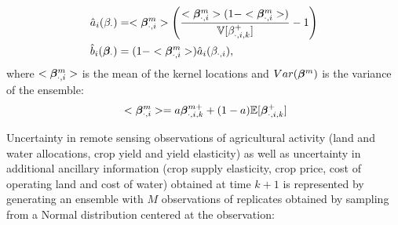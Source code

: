 \begin{equation}\label{eq:beta_params}
    \begin{split}
    &\hat{a}_i(\beta_{\cdot}) = <\bm{\beta}_{\cdot,i}^m>\left(\frac{<\bm{\beta}_{\cdot,i}^m>(1-<\bm{\beta}_{\cdot,i}^m>)}{\mathbb{V}[\beta_{\cdot,i,k}^+]} -1 \right)\\
    &\hat{b}_i(\bm{\beta}_{\cdot}) = (1-<\bm{\beta}_{\cdot,i}^m>)\hat{a}_i(\beta_{\cdot,i}),
    \end{split}
\end{equation}
 \noindent where $<\bm{\beta}_{\cdot,i}^m>$ is the mean of the kernel locations and $Var(\bm{\beta}^m)$ is the variance of the ensemble:
\begin{equation}
\begin{split}
    &<\bm{\beta}_{\cdot,i}^m> = a\bm{\beta}_{\cdot,i,k}^{m+} + (1-a)\mathbb{E}[\bm{\beta}_{\cdot,i,k}^{+}] \\
\end{split}
\end{equation}

Uncertainty in remote sensing observations of agricultural activity (land and water allocations, crop yield and yield elasticity) as well as uncertainty in additional ancillary information (crop supply elasticity, crop price, cost of operating land and cost of water) obtained at time $k+1$ is represented by generating an ensemble with $M$ observations of replicates obtained by sampling from a Normal distribution centered at the observation:


